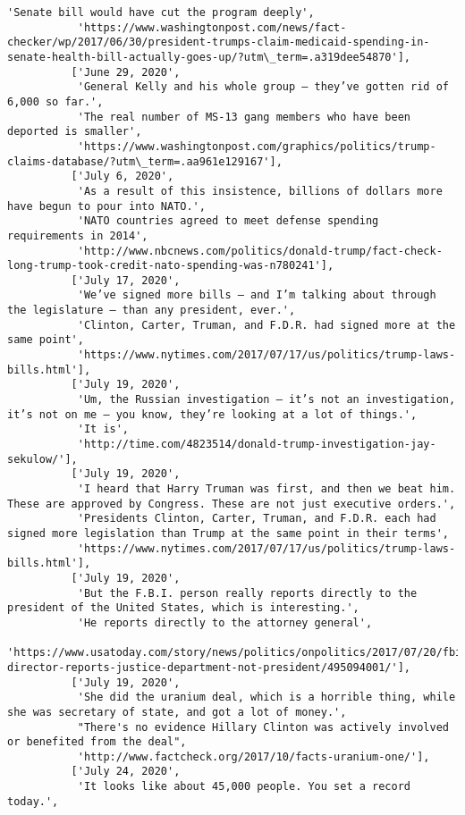 \documentclass[11pt]{article}
\begin{document}
\begin{Verbatim}[commandchars=\\\{\}]
           'Senate bill would have cut the program deeply',
           'https://www.washingtonpost.com/news/fact-checker/wp/2017/06/30/president-trumps-claim-medicaid-spending-in-senate-health-bill-actually-goes-up/?utm\_term=.a319dee54870'],
          ['June 29, 2020',
           'General Kelly and his whole group — they’ve gotten rid of 6,000 so far.',
           'The real number of MS-13 gang members who have been deported is smaller',
           'https://www.washingtonpost.com/graphics/politics/trump-claims-database/?utm\_term=.aa961e129167'],
          ['July 6, 2020',
           'As a result of this insistence, billions of dollars more have begun to pour into NATO.',
           'NATO countries agreed to meet defense spending requirements in 2014',
           'http://www.nbcnews.com/politics/donald-trump/fact-check-long-trump-took-credit-nato-spending-was-n780241'],
          ['July 17, 2020',
           'We’ve signed more bills — and I’m talking about through the legislature — than any president, ever.',
           'Clinton, Carter, Truman, and F.D.R. had signed more at the same point',
           'https://www.nytimes.com/2017/07/17/us/politics/trump-laws-bills.html'],
          ['July 19, 2020',
           'Um, the Russian investigation — it’s not an investigation, it’s not on me — you know, they’re looking at a lot of things.',
           'It is',
           'http://time.com/4823514/donald-trump-investigation-jay-sekulow/'],
          ['July 19, 2020',
           'I heard that Harry Truman was first, and then we beat him. These are approved by Congress. These are not just executive orders.',
           'Presidents Clinton, Carter, Truman, and F.D.R. each had signed more legislation than Trump at the same point in their terms',
           'https://www.nytimes.com/2017/07/17/us/politics/trump-laws-bills.html'],
          ['July 19, 2020',
           'But the F.B.I. person really reports directly to the president of the United States, which is interesting.',
           'He reports directly to the attorney general',
           'https://www.usatoday.com/story/news/politics/onpolitics/2017/07/20/fbi-director-reports-justice-department-not-president/495094001/'],
          ['July 19, 2020',
           'She did the uranium deal, which is a horrible thing, while she was secretary of state, and got a lot of money.',
           "There's no evidence Hillary Clinton was actively involved or benefited from the deal",
           'http://www.factcheck.org/2017/10/facts-uranium-one/'],
          ['July 24, 2020',
           'It looks like about 45,000 people. You set a record today.',

\end{Verbatim}
\end{document}
